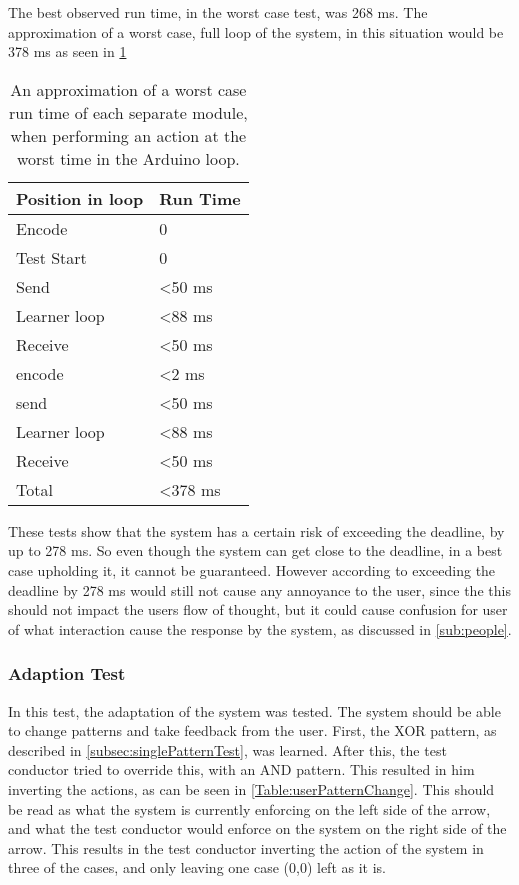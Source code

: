 The best observed run time, in the worst case test, was 268 ms. The approximation of a worst case, full loop of the system, in this situation would be 378 ms as seen in \cref{Table:WorstRunTimeAprox}

\begin{center}
	\begin{table}[htbp]
	  \centering
	  \begin{tabular}{l l}
		\toprule
		Position in loop		& Run Time  \\ \midrule
		Encode 			        & 0  	  	\\ \midrule
		Test Start		        & 0  		\\ \midrule
		Send   			        & <50 ms     \\ \midrule
		Learner loop 	        & <88 ms     \\ \midrule
		Receive 		        & <50 ms     \\ \midrule
		encode 			        & <2 ms      \\ \midrule
		send   			        & <50 ms     \\ \midrule
		Learner loop 	        & <88 ms	    \\ \midrule
		Receive 		        & <50 ms     \\ \midrule \midrule
		Total			        & <378 ms     \\
                                            \bottomrule
	  \end{tabular}
	  \caption{An approximation of a worst case run time of each separate module, when performing an action at the worst time in the Arduino loop.}\label{Table:WorstRunTimeAprox}
	\end{table}
\end{center}

These tests show that the system has a certain risk of exceeding the deadline, by up to 278 ms. So even though the system can get close to the deadline, in a best case upholding it, it cannot be guaranteed. However according to \cite{jakobnielsen} exceeding the deadline by 278 ms would still not cause any annoyance to the user, since the this should not impact the users flow of thought, but it could cause confusion for user of what interaction cause the response by the system, as discussed in \cref{sub:people}.

\subsubsection{Adaption Test}
In this test, the adaptation of the system was tested. The system should be able to change patterns and take feedback from the user. First, the XOR pattern, as described in \cref{subsec:singlePatternTest}, was learned. After this, the test conductor tried to override this, with an AND pattern. This resulted in him inverting the actions, as can be seen in \cref{Table:userPatternChange}. This should be read as what the system is currently enforcing on the left side of the arrow, and what the test conductor would enforce on the system on the right side of the arrow. This results in the test conductor inverting the action of the system in three of the cases, and only leaving one case (0,0) left as it is.

